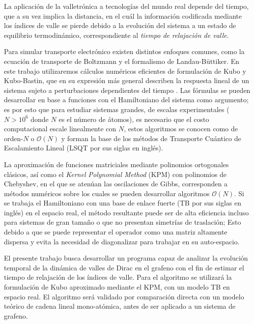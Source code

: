 La aplicación de la valletrónica a tecnologías del mundo real depende del tiempo, que a su vez implica la distancia, en el cuál la información codificada mediante los índices de valle se pierde debido a la evolución del sistema a un estado de equilibrio termodinámico, correspondiente al \emph{tiempo de relajación de valle}.

Para simular transporte electrónico existen distintos enfoques comunes, como la ecuación de transporte de Boltzmann y el formalismo de Landau-Büttiker. 
En este trabajo utilizaremos cálculos numéricos eficientes de formulación de Kubo y Kubo-Bastin, que en su expresión más general describen la respuesta lineal de un sistema sujeto a perturbaciones dependientes del tiempo \autocite{Garcia2018a}. 
Las fórmulas se pueden desarrollar en base a funciones con el Hamiltoniano del sistema como argumento; es por esto que para estudiar sistemas grandes, de escalas experimentales ($ N > 10^6 $ donde $ N $ es el número de átomos), es necesario que el costo computacional escale linealmente con $ N $, estos algoritmos se conocen como de orden-$ N $ o $ \mathcal{O}(N) $ y forman la base de los métodos de Transporte Cuántico de Escalamiento Lineal (LSQT por sus siglas en inglés).

La aproximación de funciones matriciales mediante polinomios ortogonales clásicos, así como el \emph{Kernel Polynomial Method} (KPM) con polinomios de Chebyshev, en el que se atenúan las oscilaciones de Gibbs, corresponden a métodos numéricos sobre los cuales se pueden desarrollar algoritmos $ \mathcal O(N) $. 
Si se trabaja el Hamiltoniano con una base de enlace fuerte (TB por sus siglas en inglés) en el espacio real, el método resultante puede ser de alta eficiencia incluso para sistemas de gran tamaño o que no presentan simetrías de traslación;
Esto debido a que se puede representar el operador como una matriz altamente dispersa y evita la necesidad de diagonalizar para trabajar en su auto-espacio.

El presente trabajo busca desarrollar un programa capaz de analizar la evolución temporal de la dinámica de valles de Dirac en el grafeno con el fin de estimar el tiempo de relajación de los índices de valle. Para el algoritmo se utilizará la formulación de Kubo aproximado mediante el KPM, con un modelo TB en espacio real. El algoritmo será validado por comparación directa con un modelo teórico de cadena lineal mono-atómica, antes de ser aplicado a un sistema de grafeno. 
